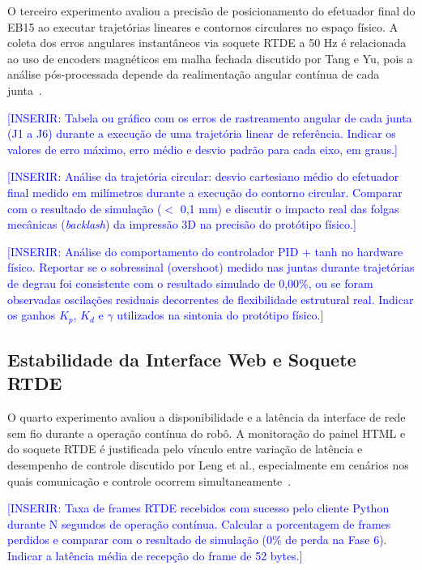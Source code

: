 O terceiro experimento avaliou a precisão de posicionamento do efetuador final do EB15 ao executar trajetórias lineares e contornos circulares no espaço físico. A coleta dos erros angulares instantâneos via soquete RTDE a 50 Hz é relacionada ao uso de encoders magnéticos em malha fechada discutido por Tang e Yu, pois a análise pós-processada depende da realimentação angular contínua de cada junta~\cite{tang2022research}.

\textcolor{blue}{[INSERIR: Tabela ou gráfico com os erros de rastreamento angular de cada junta (J1 a J6) durante a execução de uma trajetória linear de referência. Indicar os valores de erro máximo, erro médio e desvio padrão para cada eixo, em graus.]}

\textcolor{blue}{[INSERIR: Análise da trajetória circular: desvio cartesiano médio do efetuador final medido em milímetros durante a execução do contorno circular. Comparar com o resultado de simulação ($<$ 0,1 mm) e discutir o impacto real das folgas mecânicas (\textit{backlash}) da impressão 3D na precisão do protótipo físico.]}

\textcolor{blue}{[INSERIR: Análise do comportamento do controlador PID + tanh no hardware físico. Reportar se o sobressinal (overshoot) medido nas juntas durante trajetórias de degrau foi consistente com o resultado simulado de 0,00\%, ou se foram observadas oscilações residuais decorrentes de flexibilidade estrutural real. Indicar os ganhos $K_p$, $K_d$ e $\gamma$ utilizados na sintonia do protótipo físico.]}

\subsection{Estabilidade da Interface Web e Soquete RTDE}
\label{subsec:testes_rede}

O quarto experimento avaliou a disponibilidade e a latência da interface de rede sem fio durante a operação contínua do robô. A monitoração do painel HTML e do soquete RTDE é justificada pelo vínculo entre variação de latência e desempenho de controle discutido por Leng et al., especialmente em cenários nos quais comunicação e controle ocorrem simultaneamente~\cite{leng2014improving}.

\textcolor{blue}{[INSERIR: Taxa de frames RTDE recebidos com sucesso pelo cliente Python durante N segundos de operação contínua. Calcular a porcentagem de frames perdidos e comparar com o resultado de simulação (0\% de perda na Fase 6). Indicar a latência média de recepção do frame de 52 bytes.]}

